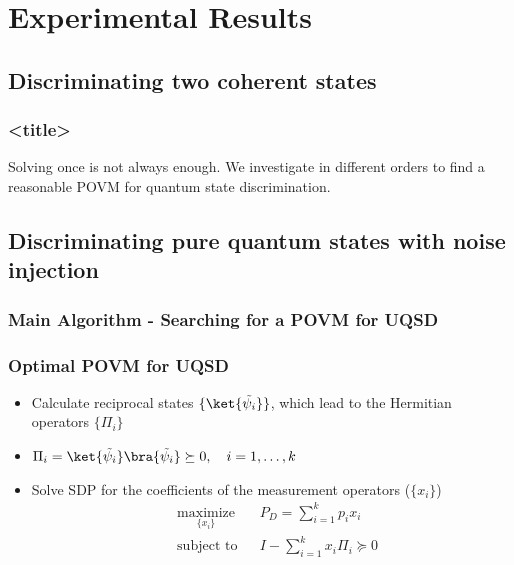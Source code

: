 \documentclass{beamer}
\begin{document}
\section{Experimental Results}
\subsection{Discriminating two coherent states}
\begin{frame}
  \frametitle{<title>}
  Solving once is not always enough.
  We investigate in different orders to find a reasonable POVM for
  quantum state discrimination.
\end{frame}

\subsection{Discriminating pure quantum states with noise injection}


\begin{frame}
  \frametitle{Main Algorithm - Searching for a POVM for UQSD}
  \begin{center}
    \scalebox{0.5}{
      
    }
  \end{center}
\end{frame}

\begin{frame}[label=frame0]
  \frametitle{Optimal POVM for UQSD}
  \begin{itemize}
    \item Calculate reciprocal states $\{\ket{\tilde{\psi_{i}}}\}$, which lead to the Hermitian operators $\{\Pi_{i}\}$
    \item $\Pi_{i} = \ket{\tilde{\psi_{i}}}\bra{\tilde{\psi_{i}}} \succeq 0, \quad i = 1, \ldots, k$
    \item Solve SDP for the coefficients of the measurement operators ($\{x_{i}\}$)
          \begin{align}
             & \underset{\{x_{i}\}}{\text{maximize}} &  & P_{D}=\sum_{i=1}^{k} p_{i} x_{i}           \\
             & \text{subject to}                     &  & I - \sum_{i=1}^{k} x_{i} \Pi_{i} \succeq 0
          \end{align}
  \end{itemize}
\end{frame}
\end{document}
